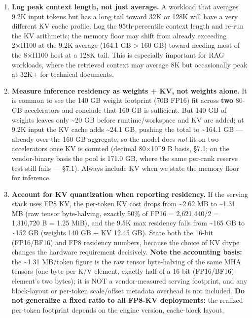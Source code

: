 \begin{enumerate}
\def\labelenumi{\arabic{enumi}.}
\setcounter{enumi}{1}
\item
  \textbf{Log peak context length, not just average.} A workload that
  averages 9.2K input tokens but has a long tail toward 32K or 128K will
  have a very different KV cache profile. Log the 95th-percentile
  context length and re-run the KV arithmetic; the memory floor may
  shift from already exceeding 2×H100 at the 9.2K average (164.1 GB
  \textgreater{} 160 GB) toward needing most of the 8×H100 host at a
  128K tail. This is especially important for RAG workloads, where the
  retrieved context may average 8K but occasionally peak at 32K+ for
  technical documents.
\item
  \textbf{Measure inference residency as weights + KV, not weights
  alone.} It is common to see the 140 GB weight footprint (70B FP16) fit
  across \textbf{two} 80-GB accelerators and conclude that 160 GB is
  sufficient. But 140 GB of weights leaves only \textasciitilde20 GB
  before runtime/workspace and KV are added; at 9.2K input the KV cache
  adds \textasciitilde24.1 GB, pushing the total to \textasciitilde164.1
  GB --- already over the 160 GB aggregate, so the model does \emph{not}
  fit on two accelerators once KV is counted (decimal 80×10\^{}9 B
  basis, §7.1; on the vendor-binary basis the pool is 171.0 GB, where
  the same per-rank reserve test still fails --- §7.1). Always include
  KV when we state the memory floor for inference.
\item
  \textbf{Account for KV quantization when reporting residency.} If the
  serving stack uses FP8 KV, the per-token KV cost drops from
  \textasciitilde2.62 MB to \textasciitilde1.31 MB (raw tensor
  byte-halving, exactly 50\% of FP16 = 2,621,440/2 = 1,310,720 B = 1.25
  MiB), and the 9.5K max residency falls from \textasciitilde165 GB to
  \textasciitilde152 GB (weights 140 GB + KV 12.45 GB). State both the
  16-bit (FP16/BF16) and FP8 residency numbers, because the choice of KV
  dtype changes the hardware requirement decisively. \textbf{Note the
  accounting basis:} the \textasciitilde1.31 MB/token figure is the raw
  tensor byte-halving of the same MHA tensors (one byte per K/V element,
  exactly half of a 16-bit (FP16/BF16) element's two bytes); it is NOT a
  vendor-measured serving footprint, and any block-layout or per-token
  scale/offset metadata overhead is not included. \textbf{Do not
  generalize a fixed ratio to all FP8-KV deployments:} the realized
  per-token footprint depends on the engine version, cache-block layout,

\end{enumerate}
